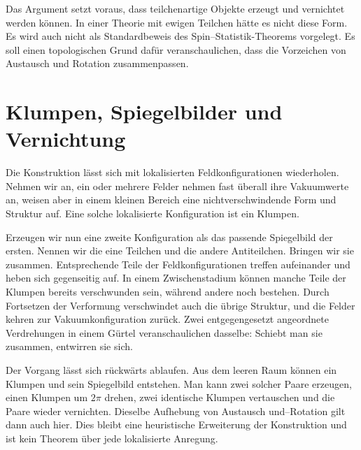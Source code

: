 \begin{classroomqa}
\end{classroomqa}

Das Argument setzt voraus, dass teilchenartige Objekte erzeugt und vernichtet werden können. In einer Theorie mit ewigen Teilchen hätte es nicht diese Form. Es wird auch nicht als Standardbeweis des Spin--Statistik-Theorems vorgelegt. Es soll einen topologischen Grund dafür veranschaulichen, dass die Vorzeichen von Austausch und Rotation zusammenpassen.

\section{Klumpen, Spiegelbilder und Vernichtung}

Die Konstruktion lässt sich mit lokalisierten Feldkonfigurationen wiederholen. Nehmen wir an, ein oder mehrere Felder nehmen fast überall ihre Vakuumwerte an, weisen aber in einem kleinen Bereich eine nichtverschwindende Form und Struktur auf. Eine solche lokalisierte Konfiguration ist ein Klumpen.

Erzeugen wir nun eine zweite Konfiguration als das passende Spiegelbild der ersten. Nennen wir die eine Teilchen und die andere Antiteilchen. Bringen wir sie zusammen. Entsprechende Teile der Feldkonfigurationen treffen aufeinander und heben sich gegenseitig auf. In einem Zwischenstadium können manche Teile der Klumpen bereits verschwunden sein, während andere noch bestehen. Durch Fortsetzen der Verformung verschwindet auch die übrige Struktur, und die Felder kehren zur Vakuumkonfiguration zurück. Zwei entgegengesetzt angeordnete Verdrehungen in einem Gürtel veranschaulichen dasselbe: Schiebt man sie zusammen, entwirren sie sich.

Der Vorgang lässt sich rückwärts ablaufen. Aus dem leeren Raum können ein Klumpen und sein Spiegelbild entstehen. Man kann zwei solcher Paare erzeugen, einen Klumpen um \(2\pi\) drehen, zwei identische Klumpen vertauschen und die Paare wieder vernichten. Dieselbe Aufhebung von Austausch und--Rotation gilt dann auch hier. Dies bleibt eine heuristische Erweiterung der Konstruktion und ist kein Theorem über jede lokalisierte Anregung.

